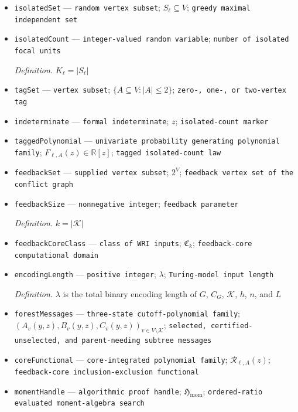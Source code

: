 \documentclass{article}
\begin{document}
\begin{itemize}
  \item \texttt{isolatedSet} --- \texttt{random vertex subset}; \(S_{\ell}\subseteq V\); \texttt{greedy maximal independent set}
  \item \texttt{isolatedCount} --- \texttt{integer-\allowbreak{}valued random variable}; \texttt{number of isolated focal units}
  \par\smallskip\noindent\emph{Definition.} \(K_{\ell}=|S_{\ell}|\)
  \item \texttt{tagSet} --- \texttt{vertex subset}; \(\{A\subseteq V:|A|\le 2\}\); \texttt{zero-\allowbreak{},\allowbreak{} one-\allowbreak{},\allowbreak{} or two-\allowbreak{}vertex tag}
  \item \texttt{indeterminate} --- \texttt{formal indeterminate}; \(z\); \texttt{isolated-\allowbreak{}count marker}
  \item \texttt{taggedPolynomial} --- \texttt{univariate probability generating polynomial family}; \(F_{\ell,A}(z)\in\mathbb R[z]\); \texttt{tagged isolated-\allowbreak{}count law}
  \item \texttt{feedbackSet} --- \texttt{supplied vertex subset}; \(2^V\); \texttt{feedback vertex set of the conflict graph}
  \item \texttt{feedbackSize} --- \texttt{nonnegative integer}; \texttt{feedback parameter}
  \par\smallskip\noindent\emph{Definition.} \(k=|\mathcal K|\)
  \item \texttt{feedbackCoreClass} --- \texttt{class of WRI inputs}; \(\mathfrak C_k\); \texttt{feedback-\allowbreak{}core computational domain}
  \item \texttt{encodingLength} --- \texttt{positive integer}; \(\lambda\); \texttt{Turing-\allowbreak{}model input length}
  \par\smallskip\noindent\emph{Definition.} \(\lambda\) is the total binary encoding length of \(G\), \(C_G\), \(\mathcal K\), \(h\), \(n\), and \(L\)
  \item \texttt{forestMessages} --- \texttt{three-\allowbreak{}state cutoff-\allowbreak{}polynomial family}; \((A_v(y,z),B_v(y,z),C_v(y,z))_{v\in V\setminus\mathcal K}\); \texttt{selected,\allowbreak{} certified-\allowbreak{}unselected,\allowbreak{} and parent-\allowbreak{}needing subtree messages}
  \item \texttt{coreFunctional} --- \texttt{core-\allowbreak{}integrated polynomial family}; \(\mathcal R_{\ell,A}(z)\); \texttt{feedback-\allowbreak{}core inclusion-\allowbreak{}exclusion functional}
  \item \texttt{momentHandle} --- \texttt{algorithmic proof handle}; \(\mathfrak H_{\mathrm{mom}}\); \texttt{ordered-\allowbreak{}ratio evaluated moment-\allowbreak{}algebra search}

\end{itemize}
\end{document}
